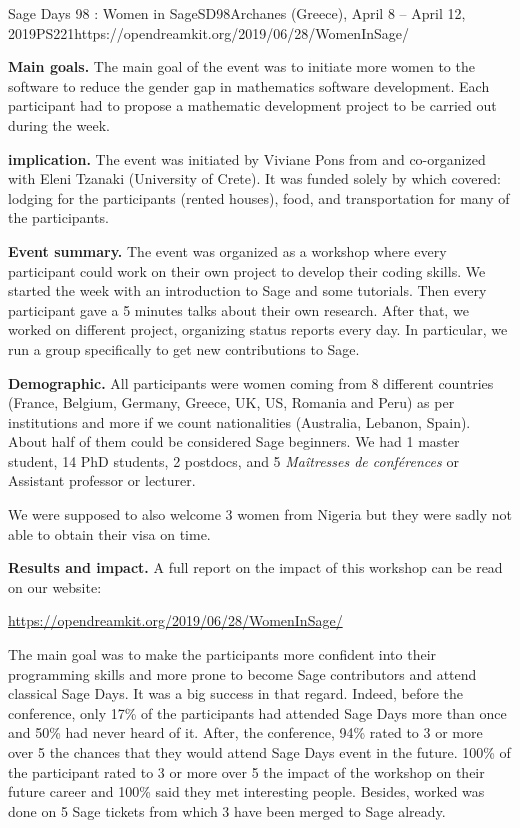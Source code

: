 \begin{event}{Sage Days 98 : Women in Sage}{SD98}{Archanes (Greece), April 8 -- April 12, 2019}{PS}{22}{1}{https://opendreamkit.org/2019/06/28/WomenInSage/}

\textbf{Main goals.} The main goal of the event was to initiate more women to the software \Sage to reduce the gender gap in mathematics software
development. Each participant had to propose a mathematic development project to be carried out during the week.

\textbf{\ODK implication.} The event was initiated by Viviane Pons from \ODK and co-organized with Eleni Tzanaki (University of Crete). It was funded solely by \ODK which covered: lodging for the participants (rented houses), food, and transportation for many of the participants.

\textbf{Event summary.} The event was organized as a workshop where every participant could work on their own project to develop their coding skills. We started the week with an introduction to Sage and some tutorials. Then every participant gave a 5 minutes talks about their own research. After that, we worked on different project, organizing status reports every day. In particular, we run a group specifically to get new contributions to Sage.

\textbf{Demographic.} All participants were women coming from 8 different countries (France, Belgium, Germany, Greece, UK, US, Romania and Peru) as per institutions and more if we count nationalities (Australia, Lebanon, Spain). About half of them could be considered Sage beginners. We had 1 master student, 14 PhD students, 2 postdocs, and 5 \textit{Maîtresses de conférences} or Assistant professor or lecturer.

We were supposed to also welcome 3 women from Nigeria but they were sadly not able to obtain their visa on time.

\textbf{Results and impact.} A full report on the impact of this
workshop can be read on our website:
\centerline{\url{https://opendreamkit.org/2019/06/28/WomenInSage/}}
The main goal was to make the participants more confident into their programming skills and more prone to become Sage contributors and attend classical Sage Days. It was a big success in that regard. Indeed, before the conference, only 17\% of the participants had attended Sage Days more than once and 50\% had never heard of it. After, the conference, 94\% rated to 3 or more over 5 the chances that they would attend Sage Days event in the future. 100\% of the participant rated to 3 or more over 5 the impact of the workshop on their future career and 100\% said they met interesting people. Besides, worked was done on 5 Sage tickets from which 3 have been merged to Sage already.


\end{event}
